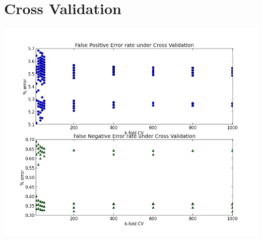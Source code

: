 \documentclass[11pt]{article}
\begin{document}
\section{Cross Validation}
\includegraphics[width = 20cm]{CV_5K_1Kfold.png}
\end{document}
